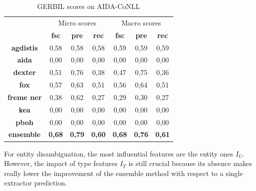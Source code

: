 \documentclass{llncs}
\begin{document}
 \begin{table}
      \centering
      \setlength{\tabcolsep}{12pt}
        \begin{tabular}{c|c|c|c|c|c|c|}
          \multicolumn{1}{c}{ } &
          \multicolumn{3}{|c|}{Micro scores} & 
          \multicolumn{3}{|c|}{Macro scores} \\
           \multicolumn{1}{c|}{ } & \textbf{fsc} & \textbf{pre} & \textbf{rec}
           & \textbf{fsc} & \textbf{pre} & \textbf{rec} \\ \hline
            \textbf{agdistis}         & 0,58  & 0,58   & 0,58  &  0,59  & 0,59   & 0,59  \\ \hline
            \textbf{aida}         & 0,00  & 0,00   & 0,00  &   0,00  & 0,00   & 0,00   \\ \hline
            \textbf{dexter}         & 0,51  & 0,76   & 0,38  &   0,47  & 0,75   & 0,36   \\ \hline
            \textbf{fox}         & 0,57  & 0,63   & 0,51  & 0,56  & 0,64   & 0,51   \\ \hline
            \textbf{freme ner}         & 0,38  & 0,62   & 0,27  &   0,29  & 0,30   & 0,27   \\ \hline
            \textbf{kea}          & 0,00  & 0,00   & 0,00  &   0,00  & 0,00   & 0,00  \\ \hline
            \textbf{pboh}         & 0,00  & 0,00   & 0,00  &   0,00  & 0,00   & 0,00   \\ \hline \hline
            \textbf{ensemble}        & \textbf{0,68}   & \textbf{0,79}   & \textbf{0,60} & \textbf{0,68}   & \textbf{0,76}   & \textbf{0,61}  \\ \hline
        \end{tabular}
    \caption{GERBIL scores on AIDA-CoNLL}
    \label{linkscoresgerbilaida}
\end{table}








For entity disambiguation, the most influential features are the entity ones \textit{$I_U$}. However, the impact of type features \textit{$I_T$} is still crucial because its absence makes really lower the improvement of the ensemble method with respect to a single extractor prediction.

\end{document}

